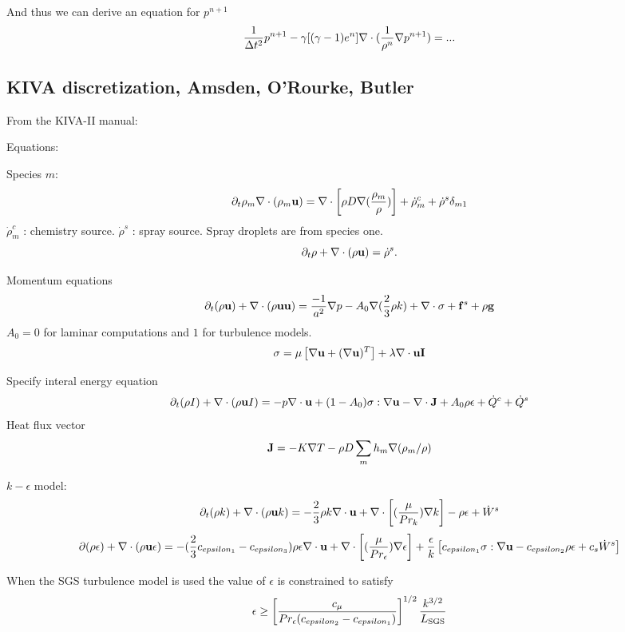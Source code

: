 \documentclass[10pt]{article}
\begin{document}
And thus we can derive an equation for $p^{n+1}$
\[
   {1\over \Delta t^2} p^{n+1} - \gamma[(\gamma-1)e^n]\nabla\cdot( {1\over\rho^n}\nabla p^{n+1} ) = ...
\]

\subsection{KIVA discretization, Amsden, O'Rourke, Butler}


From the KIVA-II manual:


\newcommand{\rhoDot}{\dot{\rho}}
\newcommand{\Qdot}{\dot{Q}}
\newcommand{\Wdot}{\dot{W}}
\newcommand{\wDot}{\dot{w}}
\newcommand{\sigmav}{{\bf\sigma}}
\newcommand{\Tt}{\tilde{T}}

Equations:

Species $m$:
\[
   \partial_t \rho_m \grad\cdot( \rho_m \uv) = \grad\cdot\left[ \rho D \grad( {\rho_m \over \rho} )\right]
      + \rhoDot_m^c + \rhoDot^s \delta_{m1}
\]
$\rhoDot_m^c$ : chemistry source. $\rhoDot^s$ : spray source.
Spray droplets are from species one. 
\[
   \partial_t \rho +\grad\cdot( \rho \uv ) = \rhoDot^s.
\]

Momentum equations
\[
   \partial_t ( \rho \uv ) +\grad\cdot( \rho \uv \uv ) = {-1\over a^2 } \grad p 
      -A_0 \grad( {2\over3} \rho k) + \grad\cdot\sigmav + \fv^s + \rho \gv
\]
$A_0=0$ for laminar computations and $1$ for turbulence models.
\[
  \sigmav = \mu \left[ \grad\uv + (\grad\uv)^T \right] + \lambda \grad\cdot\uv \Iv
\]

Specify interal energy equation
\[
  \partial_t (\rho I) + \grad\cdot( \rho\uv I) = -p \grad\cdot\uv + (1-A_0)\sigmav:\grad\uv
                - \grad\cdot\Jv + A_0 \rho \epsilon + \Qdot^c + \Qdot^s
\]
Heat flux vector
\[
   {\bf J} = -K\nabla T - \rho D\sum_m h_m \nabla( \rho_m/\rho )
\]

$k-\epsilon$ model:
\[
   \partial_t (\rho k) + \grad\cdot( \rho \uv k) = - {2\over 3} \rho k \grad\cdot\uv 
     + \grad\cdot \left[ ({\mu \over Pr_k }) \grad k\right] - \rho\epsilon + \Wdot^s
\]
\[
  \partial(\rho\epsilon) + \grad\cdot( \rho \uv \epsilon) 
      = -( {2\over 3} c_{epsilon_1} -c_{epsilon_3} ) \rho \epsilon\grad\cdot\uv 
        +\grad\cdot \left[ ({\mu \over Pr_\epsilon }) \grad \epsilon \right] 
       + {\epsilon\over k}\left[ c_{epsilon_1}\sigmav:\grad\uv - c_{epsilon_2}\rho\epsilon + c_s \Wdot^s\right]
\]

When the SGS turbulence model is used the value of $\epsilon$ is constrained to satisfy
\[
   \epsilon \ge \left[ c_\mu \over Pr_\epsilon (c_{epsilon_2} -c_{epsilon_1})\right]^{1/2}
        {k^{3/2}\over L_{\rm SGS}}
\]
\end{document}
